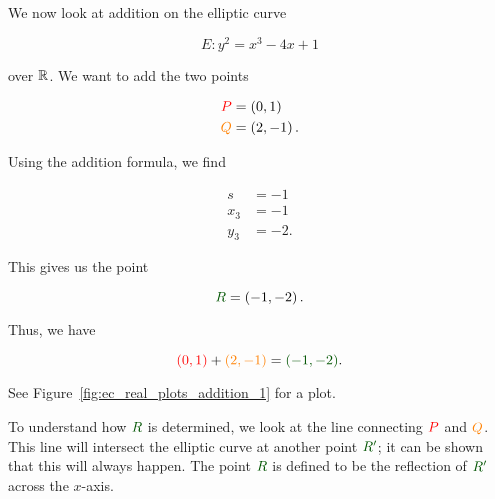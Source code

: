 \begin{example}
\label{example:ec_real_addition_1}
We now look at addition on the \gls{elliptic curve}

\begin{equation}
    E: y^{2} = x^{3} - 4x + 1
\end{equation}

\noindent
over $\mathbb{R}$.
We want to add the two points

\begin{align}
    \textcolor{red}{P} &= \left( 0,1 \right) \nonumber\\
    \textcolor{orange}{Q} &= \left( 2,-1 \right).
\end{align}

\noindent
Using the addition formula, we find

\begin{align}
    s &= -1 \nonumber\\
    x_{3} &= -1 \nonumber\\
    y_{3} &= -2.
\end{align}

\noindent
This gives us the point

\begin{equation}
    \textcolor[rgb]{0,0.33,0}{R} = \parens{-1,-2}.
\end{equation}

\noindent
Thus, we have

\begin{equation}
    \textcolor{red}{\parens{0,1}} + \textcolor{orange}{\parens{2,-1}}
    = \textcolor[rgb]{0,0.33,0}{\parens{-1,-2}}.
\end{equation}

\noindent
See Figure~\ref{fig:ec_real_plots_addition_1}
for a plot.

To understand how $\textcolor[rgb]{0,0.33,0}{R}$ is determined,
we look at the line connecting
$\textcolor{red}{P}$ and $\textcolor{orange}{Q}$.
This line will intersect the \gls{elliptic curve} at another point
$\textcolor[rgb]{0,0.33,0}{R'}$;
it can be shown that this will always happen.
The point $\textcolor[rgb]{0,0.33,0}{R}$ is defined to be
the reflection of $\textcolor[rgb]{0,0.33,0}{R'}$
across the $x$-axis.
\end{example}


